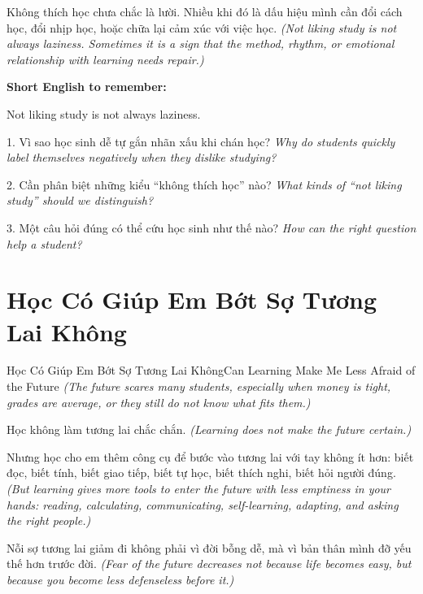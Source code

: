 \begin{baihoc}
Không thích học chưa chắc là lười. Nhiều khi đó là dấu hiệu mình cần đổi cách học, đổi nhịp học, hoặc chữa lại cảm xúc với việc học.
\textit{(Not liking study is not always laziness. Sometimes it is a sign that the method, rhythm, or emotional relationship with learning needs repair.)}
\end{baihoc}

\begin{ghinhoanh}
\textbf{Short English to remember:}

Not liking study is not always laziness.

\end{ghinhoanh}

\begin{tuhocnhanh}
1. Vì sao học sinh dễ tự gắn nhãn xấu khi chán học? \textit{Why do students quickly label themselves negatively when they dislike studying?}

2. Cần phân biệt những kiểu “không thích học” nào? \textit{What kinds of “not liking study” should we distinguish?}

3. Một câu hỏi đúng có thể cứu học sinh như thế nào? \textit{How can the right question help a student?}
\end{tuhocnhanh}
\ngancach

\section{Học Có Giúp Em Bớt Sợ Tương Lai Không}
\begin{truyen}{Học Có Giúp Em Bớt Sợ Tương Lai Không}{Can Learning Make Me Less Afraid of the Future}
\textit{(The future scares many students, especially when money is tight, grades are average, or they still do not know what fits them.)}

Học không làm tương lai chắc chắn.
\textit{(Learning does not make the future certain.)}

Nhưng học cho em thêm công cụ để bước vào tương lai với tay không ít hơn: biết đọc, biết tính, biết giao tiếp, biết tự học, biết thích nghi, biết hỏi người đúng.
\textit{(But learning gives more tools to enter the future with less emptiness in your hands: reading, calculating, communicating, self-learning, adapting, and asking the right people.)}

Nỗi sợ tương lai giảm đi không phải vì đời bỗng dễ, mà vì bản thân mình đỡ yếu thế hơn trước đời.
\textit{(Fear of the future decreases not because life becomes easy, but because you become less defenseless before it.)}
\end{truyen}

